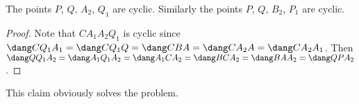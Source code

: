 \begin{claim*}
  The points $P$, $Q$, $A_2$, $Q_1$ are cyclic.
  Similarly the points $P$, $Q$, $B_2$, $P_1$ are cyclic.
\end{claim*}
\begin{proof}
  Note that $CA_1A_2Q_1$ is cyclic since
  $\dang CQ_1A_1 = \dang CQ_1Q = \dang CBA = \dang CA_2A = \dang CA_2A_1$.
  Then $\dang QQ_1A_2 = \dang A_1Q_1A_2 = \dang A_1 C A_2
  = \dang B C A_2 = \dang B A A_2 = \dang Q P A_2$.
\end{proof}

This claim obviously solves the problem.
